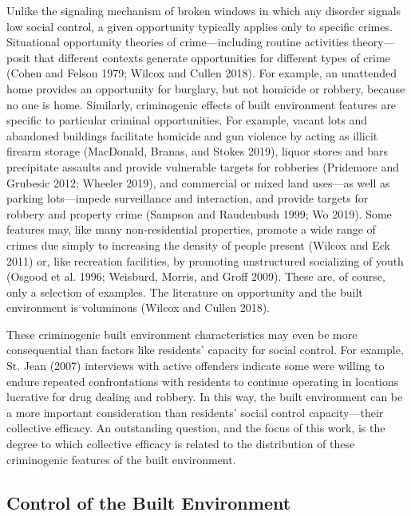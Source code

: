 \documentclass [11pt, proquest] {uwthesis}[2015/03/03]
\begin{document}
Unlike the signaling mechanism of broken windows in which any disorder signals low social control, a given opportunity typically applies only to specific crimes. Situational opportunity theories of crime---including routine activities theory---posit that different contexts generate opportunities for different types of crime (Cohen and Felson 1979; Wilcox and Cullen 2018). For example, an unattended home provides an opportunity for burglary, but not homicide or robbery, because no one is home. Similarly, criminogenic effects of built environment features are specific to particular criminal opportunities. For example, vacant lots and abandoned buildings facilitate homicide and gun violence by acting as illicit firearm storage (MacDonald, Branas, and Stokes 2019), liquor stores and bars precipitate assaults and provide vulnerable targets for robberies (Pridemore and Grubesic 2012; Wheeler 2019), and commercial or mixed land uses---as well as parking lots---impede surveillance and interaction, and provide targets for robbery and property crime (Sampson and Raudenbush 1999; Wo 2019). Some features may, like many non-residential properties, promote a wide range of crimes due simply to increasing the density of people present (Wilcox and Eck 2011) or, like recreation facilities, by promoting unstructured socializing of youth (Osgood et al. 1996; Weisburd, Morris, and Groff 2009). These are, of course, only a selection of examples. The literature on opportunity and the built environment is voluminous (Wilcox and Cullen 2018).

These criminogenic built environment characteristics may even be more consequential than factors like residents' capacity for social control. For example, St. Jean (2007) interviews with active offenders indicate some were willing to endure repeated confrontations with residents to continue operating in locations lucrative for drug dealing and robbery. In this way, the built environment can be a more important consideration than residents' social control capacity---their collective efficacy. An outstanding question, and the focus of this work, is the degree to which collective efficacy is related to the distribution of these criminogenic features of the built environment.

\hypertarget{control-of-the-built-environment}{%
\subsection{Control of the Built Environment}\label{control-of-the-built-environment}}
\end{document}
